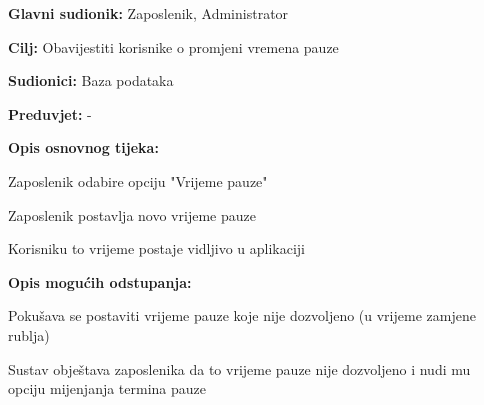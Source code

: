 \begin{packed_item}
	
	\item \textbf{Glavni sudionik: }Zaposlenik, Administrator
	\item  \textbf{Cilj:} Obavijestiti korisnike o promjeni vremena pauze
	\item  \textbf{Sudionici:} Baza podataka
	\item  \textbf{Preduvjet:} -
	\item  \textbf{Opis osnovnog tijeka:}
	
	\item[] \begin{packed_enum}
		
		\item Zaposlenik odabire opciju "Vrijeme pauze"
		\item Zaposlenik postavlja novo vrijeme pauze
		\item Korisniku to vrijeme postaje vidljivo u aplikaciji
		
	\end{packed_enum}
	\item  \textbf{Opis mogućih odstupanja:}
	
	\item[] \begin{packed_item}
		
		\item[2.a] Pokušava se postaviti vrijeme pauze koje nije dozvoljeno (u vrijeme zamjene rublja) 
		\item[] \begin{packed_enum}
			
			\item Sustav obještava zaposlenika da to vrijeme pauze nije dozvoljeno i nudi mu opciju mijenjanja termina pauze
			
		\end{packed_enum}
		
		
	\end{packed_item}
\end{packed_item}
\noindent {}
